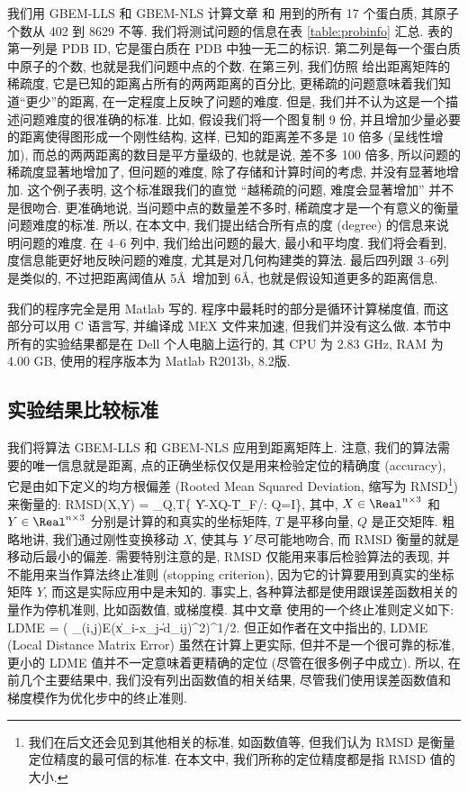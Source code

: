 我们用 GBEM-LLS 和 GBEM-NLS 计算文章 \cite{Biswas2008} 和 \cite{Sit2009}
用到的所有 17 个蛋白质, 其原子个数从 402 到 8629 不等. 
我们将测试问题的信息在表 \ref{table:probinfo} 汇总. 
表的第一列是 PDB ID, 它是蛋白质在 PDB 中独一无二的标识. 
第二列是每一个蛋白质中原子的个数, 也就是我们问题中点的个数. 
在第三列, 我们仿照 \cite{Biswas2008} 给出距离矩阵的稀疏度, 
它是已知的距离占所有的两两距离的百分比,
更稀疏的问题意味着我们知道``更少''的距离, 在一定程度上反映了问题的难度.
但是, 我们并不认为这是一个描述问题难度的很准确的标准.
比如, 假设我们将一个图复制 9 份, 并且增加少量必要的距离使得图形成一个刚性结构,
这样, 已知的距离差不多是 10 倍多 (呈线性增加), 
而总的两两距离的数目是平方量级的, 也就是说, 差不多 100 倍多, 
所以问题的稀疏度显著地增加了, 但问题的难度, 
除了存储和计算时间的考虑, 并没有显著地增加.
这个例子表明, 这个标准跟我们的直觉 \pozhe ``越稀疏的问题, 难度会显著增加''
并不是很吻合.
更准确地说, 当问题中点的数量差不多时, 稀疏度才是一个有意义的衡量问题难度的标准.
所以, 在本文中, 我们提出结合所有点的度 (degree) 的信息来说明问题的难度.
在 4--6 列中, 我们给出问题的最大, 最小和平均度.
我们将会看到, 度信息能更好地反映问题的难度, 尤其是对几何构建类的算法.
最后四列跟 3--6列是类似的, 不过把距离阈值从 5\AA ~增加到 6\AA,
也就是假设知道更多的距离信息.

我们的程序完全是用 Matlab 写的.
程序中最耗时的部分是循环计算梯度值, 
而这部分可以用 C 语言写, 并编译成 MEX 文件来加速,
但我们并没有这么做.
本节中所有的实验结果都是在 Dell 个人电脑上运行的,
其 CPU 为 2.83 GHz, RAM 为 4.00 GB, 
使用的程序版本为 Matlab R2013b, 8.2版.

\subsection{实验结果比较标准}
\label{sec:result}
我们将算法 GBEM-LLS 和 GBEM-NLS 应用到距离矩阵上.
注意, 我们的算法需要的唯一信息就是距离,
点的正确坐标仅仅是用来检验定位的精确度 (accuracy),
它是由如下定义的均方根偏差 (Rooted Mean Squared Deviation, 缩写为 RMSD\footnote{我们在后文还会见到其他相关的标准, 如函数值等, 但我们认为 RMSD 是衡量定位精度的最可信的标准. 在本文中, 我们所称的定位精度都是指 RMSD 值的大小.}) 来衡量的:
\be RMSD(X,Y) = \min_{Q,T}\{ \|Y-XQ-T\|_{F}/: Q=I\}, \ee
其中, $X\in \Real^{n\times 3}$ 和 $Y\in \Real^{n\times 3}$ 
分别是计算的和真实的坐标矩阵, 
$T$ 是平移向量, $Q$ 是正交矩阵.
粗略地讲, 我们通过刚性变换移动 $X$, 使其与 $Y$ 尽可能地吻合,
而 RMSD 衡量的就是移动后最小的偏差. 
需要特别注意的是, RMSD 仅能用来事后检验算法的表现,
并不能用来当作算法终止准则 (stopping criterion), 
因为它的计算要用到真实的坐标矩阵 $Y$,
而这是实际应用中是未知的.
事实上, 各种算法都是使用跟误差函数相关的量作为停机准则,
比如函数值, 或梯度模. 
其中文章 \cite{Biswas2008} 使用的一个终止准则定义如下:
\be LDME = \Big( \sum_{(i,j)\in E}\big(\|x_i-x_j\|-d_{ij}\big)^2\Big)^{1/2}. \ee
但正如作者在文中指出的, 
LDME (Local Distance Matrix Error) 虽然在计算上更实际, 
但并不是一个很可靠的标准, 
更小的 LDME 值并不一定意味着更精确的定位 (尽管在很多例子中成立).
所以, 在前几个主要结果中, 我们没有列出函数值的相关结果, 
尽管我们使用误差函数值和梯度模作为优化步中的终止准则.


